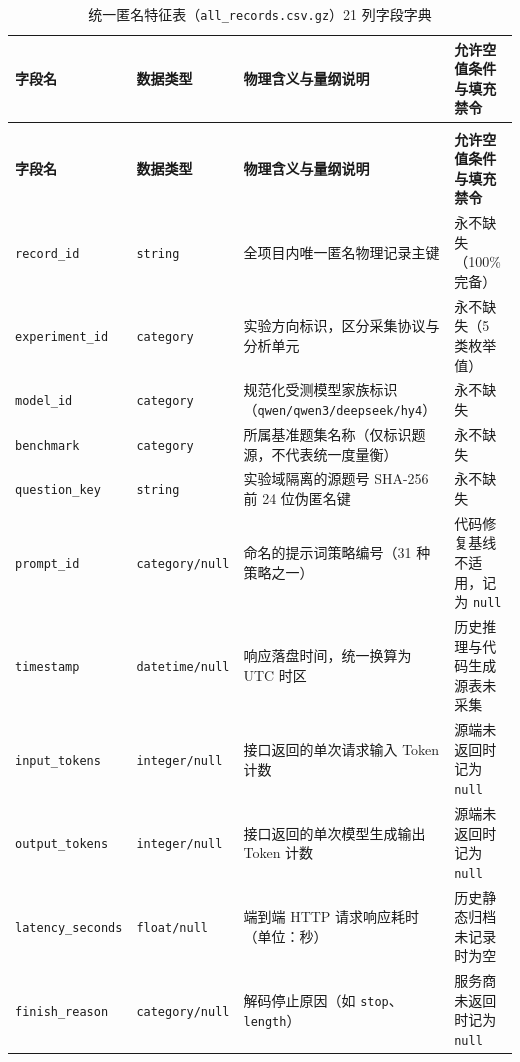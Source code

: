 {\setlength{\parfillskip}{0pt plus 1fil}
\ReportTableStyle
\begin{longtable}{@{}>{\raggedright\arraybackslash}p{3.3cm} >{\raggedright\arraybackslash}p{2.2cm} >{\raggedright\arraybackslash}p{4.6cm} >{\raggedright\arraybackslash}p{4.3cm}@{}}
\caption{统一匿名特征表（\texttt{all\_records.csv.gz}）21 列字段字典}\label{tab:app-a-dict21}\\
\toprule
\textbf{字段名} & \textbf{数据类型} & \textbf{物理含义与量纲说明} & \textbf{允许空值条件与填充禁令} \\
\midrule
\endfirsthead
\multicolumn{4}{@{}l}{\fontsize{10bp}{12bp}\selectfont 表~\ref{tab:app-a-dict21}（续）：统一匿名特征表字段字典} \\
\toprule
\textbf{字段名} & \textbf{数据类型} & \textbf{物理含义与量纲说明} & \textbf{允许空值条件与填充禁令} \\
\midrule
\endhead
\bottomrule
\endfoot
\texttt{record\_id} & \texttt{string} & 全项目内唯一匿名物理记录主键 & 永不缺失（100\% 完备） \\
\texttt{experiment\_id} & \texttt{category} & 实验方向标识，区分采集协议与分析单元 & 永不缺失（5 类枚举值） \\
\texttt{model\_id} & \texttt{category} & 规范化受测模型家族标识（\texttt{qwen/qwen3/deepseek/hy4}） & 永不缺失 \\
\texttt{benchmark} & \texttt{category} & 所属基准题集名称（仅标识题源，不代表统一度量衡） & 永不缺失 \\
\texttt{question\_key} & \texttt{string} & 实验域隔离的源题号 SHA-256 前 24 位伪匿名键 & 永不缺失 \\
\texttt{prompt\_id} & \texttt{category/null} & 命名的提示词策略编号（31 种策略之一） & 代码修复基线不适用，记为 \texttt{null} \\
\texttt{timestamp} & \texttt{datetime/null} & 响应落盘时间，统一换算为 UTC 时区 & 历史推理与代码生成源表未采集 \\
\texttt{input\_tokens} & \texttt{integer/null} & 接口返回的单次请求输入 Token 计数 & 源端未返回时记为 \texttt{null} \\
\texttt{output\_tokens} & \texttt{integer/null} & 接口返回的单次模型生成输出 Token 计数 & 源端未返回时记为 \texttt{null} \\
\texttt{latency\_seconds} & \texttt{float/null} & 端到端 HTTP 请求响应耗时（单位：秒） & 历史静态归档未记录时为空 \\
\texttt{finish\_reason} & \texttt{category/null} & 解码停止原因（如 \texttt{stop}、\texttt{length}） & 服务商未返回时记为 \texttt{null} \\

\end{longtable}}
